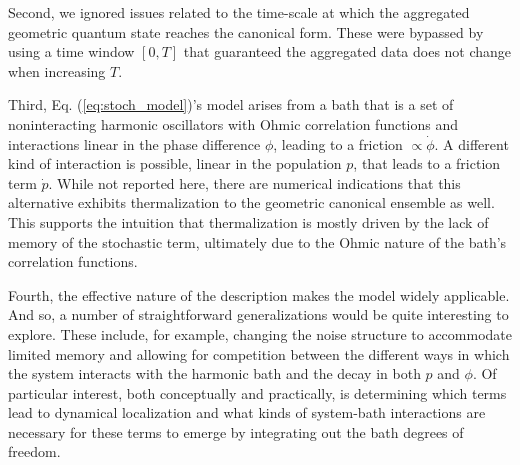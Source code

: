 \documentclass[draft,nofootinbib,pre,twocolumn,showpacs,showkeys,groupaddress,preprintnumbers,floatfix]{revtex4-1}
\newcommand{\1}{\mathbbm{1}}
\begin{document}
Second, we ignored issues related to the time-scale at which the aggregated
geometric quantum state reaches the canonical form. These were bypassed by
using a time window $[0,T]$ that guaranteed the aggregated data does not
change when increasing $T$.

Third, Eq. (\ref{eq:stoch_model})'s model arises from a bath that is a set of
noninteracting harmonic oscillators with Ohmic correlation functions and
interactions linear in the phase difference $\phi$, leading to a friction
$\propto \dot{\phi}$. A different kind of interaction is possible, linear in
the population $p$, that leads to a friction term $\dot{p}$. While not
reported here, there are numerical indications that this alternative exhibits
thermalization to the geometric canonical ensemble as well. This supports the
intuition that thermalization is mostly driven by the lack of memory of the
stochastic term, ultimately due to the Ohmic nature of the bath's correlation
functions. 

Fourth, the effective nature of the description makes the model widely
applicable. And so, a number of straightforward generalizations would be quite
interesting to explore. These include, for example, changing the noise
structure to accommodate limited memory and allowing for competition between
the different ways in which the system interacts with the harmonic bath and
the decay in both $p$ and $\phi$. Of particular interest, both conceptually
and practically, is determining which terms lead to dynamical localization and
what kinds of system-bath interactions are necessary for these terms to emerge
by integrating out the bath degrees of freedom. 
\end{document}
